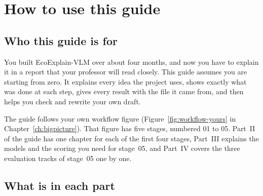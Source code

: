 \chapter{How to use this guide}
\label{ch:start}

\section{Who this guide is for}

You built EcoExplain-VLM over about four months, and now you have to explain it in a report that your professor will read closely. This guide assumes you are starting from zero. It explains every idea the project uses, shows exactly what was done at each step, gives every result with the file it came from, and then helps you check and rewrite your own draft.

The guide follows your own workflow figure (Figure~\ref{fig:workflow-yours} in Chapter~\ref{ch:bigpicture}). That figure has five stages, numbered 01 to 05. Part~II of the guide has one chapter for each of the first four stages, Part~III explains the models and the scoring you need for stage~05, and Part~IV covers the three evaluation tracks of stage~05 one by one.

\section{What is in each part}

